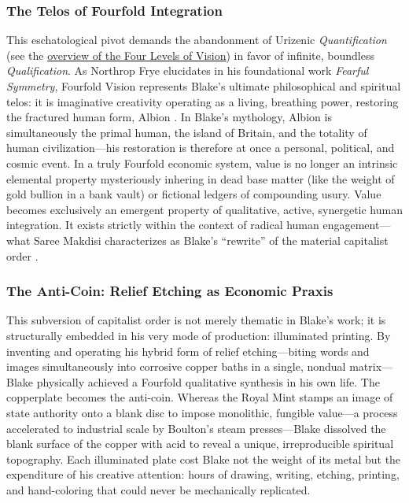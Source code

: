 \documentclass[
]{article}
\begin{document}
\subsubsection{The Telos of Fourfold
Integration}\label{the-telos-of-fourfold-integration}

This eschatological pivot demands the abandonment of Urizenic
\emph{Quantification} (see the
\href{03b_los_and_fourfold_vision.md\#the-four-levels-of-monetary-vision-and-generation}{overview
of the Four Levels of Vision}) in favor of infinite, boundless
\emph{Qualification}. As Northrop Frye elucidates in his foundational
work \emph{Fearful Symmetry}, Fourfold Vision represents Blake's
ultimate philosophical and spiritual telos: it is imaginative creativity
operating as a living, breathing power, restoring the fractured human
form, Albion \citep{frye1947fearful}. In Blake's mythology, Albion is
simultaneously the primal human, the island of Britain, and the totality
of human civilization---his restoration is therefore at once a personal,
political, and cosmic event. In a truly Fourfold economic system, value
is no longer an intrinsic elemental property mysteriously inhering in
dead base matter (like the weight of gold bullion in a bank vault) or
fictional ledgers of compounding usury. Value becomes exclusively an
emergent property of qualitative, active, synergetic human integration.
It exists strictly within the context of radical human engagement---what
Saree Makdisi characterizes as Blake's ``rewrite'' of the material
capitalist order \citep{makdisi2003william}.

\subsubsection{The Anti-Coin: Relief Etching as Economic
Praxis}\label{the-anti-coin-relief-etching-as-economic-praxis}

This subversion of capitalist order is not merely thematic in Blake's
work; it is structurally embedded in his very mode of production:
illuminated printing. By inventing and operating his hybrid form of
relief etching---biting words and images simultaneously into corrosive
copper baths in a single, nondual matrix---Blake physically achieved a
Fourfold qualitative synthesis in his own life. The copperplate becomes
the anti-coin. Whereas the Royal Mint stamps an image of state authority
onto a blank disc to impose monolithic, fungible value---a process
accelerated to industrial scale by Boulton's steam presses---Blake
dissolved the blank surface of the copper with acid to reveal a unique,
irreproducible spiritual topography. Each illuminated plate cost Blake
not the weight of its metal but the expenditure of his creative
attention: hours of drawing, writing, etching, printing, and
hand-coloring that could never be mechanically replicated.
\end{document}
